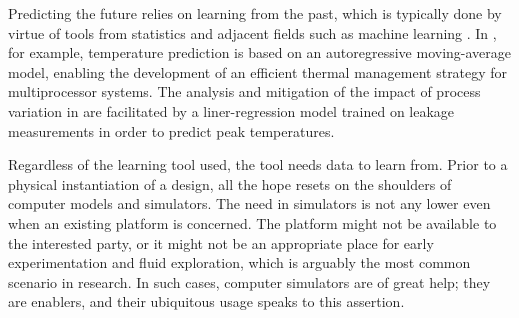 Predicting the future relies on learning from the past, which is typically done
by virtue of tools from statistics and adjacent fields such as machine learning
\cite{bishop2006}. In \cite{coskun2008}, for example, temperature prediction is
based on an autoregressive moving-average model, enabling the development of an
efficient thermal management strategy for multiprocessor systems. The analysis
and mitigation of the impact of process variation in \cite{juan2014} are
facilitated by a liner-regression model trained on leakage measurements in order
to predict peak temperatures.

Regardless of the learning tool used, the tool needs data to learn from. Prior
to a physical instantiation of a design, all the hope resets on the shoulders of
computer models and simulators. The need in simulators is not any lower even
when an existing platform is concerned. The platform might not be available to
the interested party, or it might not be an appropriate place for early
experimentation and fluid exploration, which is arguably the most common
scenario in research. In such cases, computer simulators are of great help; they
are enablers, and their ubiquitous usage speaks to this assertion.
